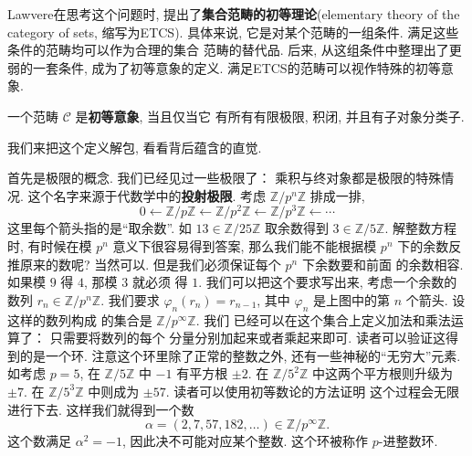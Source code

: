 Lawvere在思考这个问题时, 提出了\textbf{集合范畴的初等理论}(elementary
theory of the category of sets, 缩写为ETCS). 具体来说,
它是对某个范畴的一组条件. 满足这些条件的范畴均可以作为合理的集合
范畴的替代品. 后来, 从这组条件中整理出了更弱的一套条件,
成为了初等意象的定义. 满足ETCS的范畴可以视作特殊的初等意象.
\begin{definition}
一个范畴 \(\mathcal C\) 是\textbf{初等意象}, 当且仅当它
有所有有限极限, 积闭, 并且有子对象分类子.
\end{definition}
我们来把这个定义解包, 看看背后蕴含的直觉.

首先是极限的概念.
我们已经见过一些极限了： 乘积与终对象都是极限的特殊情况.
这个名字来源于代数学中的\textbf{投射极限}. 考虑
\(\mathbb Z/p^n\mathbb Z\) 排成一排,
\[0 \longleftarrow \mathbb Z/p\mathbb Z
\longleftarrow \mathbb Z/p^2\mathbb Z
\longleftarrow \mathbb Z/p^3\mathbb Z
\longleftarrow \cdots\]
这里每个箭头指的是“取余数”. 如
\(13 \in \mathbb Z/25\mathbb Z\)
取余数得到 \(3 \in \mathbb Z/5 \mathbb Z\).
解整数方程时, 有时候在模 \(p^n\) 意义下很容易得到答案,
那么我们能不能根据模 \(p^n\) 下的余数反推原来的数呢?
当然可以. 但是我们必须保证每个 \(p^n\) 下余数要和前面
的余数相容. 如果模 \(9\) 得 \(4\), 那模 \(3\) 就必须
得 \(1\). 我们可以把这个要求写出来, 考虑一个余数的数列
\(r_n \in \mathbb Z/p^n\mathbb Z\).
我们要求 \(\varphi_n(r_n) = r_{n-1}\), 其中
\(\varphi_n\) 是上图中的第 \(n\) 个箭头. 设这样的数列构成
的集合是 \(\mathbb Z/p^{\infty}\mathbb Z\). 我们
已经可以在这个集合上定义加法和乘法运算了： 只需要将数列的每个
分量分别加起来或者乘起来即可. 读者可以验证这得到的是一个环.
注意这个环里除了正常的整数之外, 还有一些神秘的“无穷大”元素.
如考虑 \(p = 5\), 在 \(\mathbb Z/5\mathbb Z\) 中
\(-1\) 有平方根 \(\pm2\). 在 \(\mathbb Z/5^2\mathbb Z\)
中这两个平方根则升级为 \(\pm7\). 在 \(\mathbb Z/5^3\mathbb Z\)
中则成为 \(\pm57\). 读者可以使用初等数论的方法证明
这个过程会无限进行下去. 这样我们就得到一个数
\[\alpha = (2,7,57,182,\dots) \in \mathbb Z/p^{\infty}\mathbb Z.\]
这个数满足 \(\alpha^2 = -1\), 因此决不可能对应某个整数.
这个环被称作 \(p\)-进整数环.

